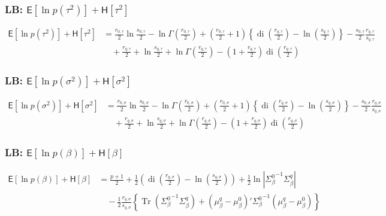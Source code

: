 \documentclass[11pt]{article}
\DeclareMathOperator{\Tr}{Tr}
\newcommand{\opn}{\operatorname}
\begin{document}
\subsubsection{LB: $\mathsf{E}\left[\ln p\left(\tau^{2}\right)\right]+\mathsf{H}\left[\tau^{2}\right]$}
\begin{align*}
  \mathsf{E}\left[\ln p\left(\tau^{2}\right)\right]+\mathsf{H}\left[\tau^{2}\right] &= \frac{r_{0,\tau}}{2}\ln \frac{s_{0,\tau}}{2} -\ln\Gamma\left(\frac{r_{0,\tau}}{2}\right) +\left(\frac{r_{0,\tau}}{2}+1\right)\left\{\opn{di}\left(\frac{r_{q,\tau}}{2}\right)-\ln\left(\frac{s_{q,\tau}}{2}\right) \right\} -\frac{s_{0,\tau}}{2}\frac{r_{q,\tau}}{s_{q,\tau}}\\
  &\quad +\frac{r_{q,\tau}}{2} +\ln\frac{s_{q,\tau}}{2} +\ln\Gamma\left(\frac{r_{q,\tau}}{2}\right) -\left(1+\frac{r_{q,\tau}}{2}\right)\opn{di}\left(\frac{r_{q,\tau}}{2}\right)
\end{align*}
\subsubsection{LB: $\mathsf{E}\left[\ln p\left(\sigma^{2}\right)\right]+\mathsf{H}\left[\sigma^{2}\right]$}
\begin{align*}
  \mathsf{E}\left[\ln p\left(\sigma^{2}\right)\right]+\mathsf{H}\left[\sigma^{2}\right] &= \frac{r_{0,\sigma}}{2}\ln \frac{s_{0,\sigma}}{2} -\ln\Gamma\left(\frac{r_{0,\sigma}}{2}\right) +\left(\frac{r_{0,\sigma}}{2}+1\right)\left\{\opn{di}\left(\frac{r_{q,\sigma}}{2}\right)-\ln\left(\frac{s_{q,\sigma}}{2}\right) \right\} -\frac{s_{0,\sigma}}{2}\frac{r_{q,\sigma}}{s_{q,\sigma}}\\
  &\quad +\frac{r_{q,\sigma}}{2} +\ln\frac{s_{q,\sigma}}{2} +\ln\Gamma\left(\frac{r_{q,\sigma}}{2}\right) -\left(1+\frac{r_{q,\sigma}}{2}\right)\opn{di}\left(\frac{r_{q,\sigma}}{2}\right)
\end{align*}
\subsubsection{LB: $\mathsf{E}\left[\ln p\left(\beta\right)\right]+\mathsf{H}\left[\beta\right] $}
\begin{align*}
  \mathsf{E}\left[\ln p\left(\beta\right)\right]+\mathsf{H}\left[\beta\right] &= \frac{p+1}{2} +\frac{1}{2}\left(\opn{di}\left(\frac{r_{q,\sigma}}{2}\right)-\ln\left(\frac{s_{q,\sigma}}{2}\right)\right) +\frac{1}{2}\ln\left|{\Sigma_{\beta}^{0}}^{-1}\Sigma_{\beta}^{q}\right|\\
  &\quad -\frac{1}{2}\frac{r_{q,\sigma}}{s_{q,\sigma}}\left\{\Tr\left({\Sigma_{\beta}^{0}}^{-1}\Sigma_{\beta}^{q}\right)+\left(\mu_{\beta}^{q}-\mu_{\beta}^{0}\right)'{\Sigma_{\beta}^{0}}^{-1}\left(\mu_{\beta}^{q}-\mu_{\beta}^{0}\right) \right\}
\end{align*}
\end{document}
